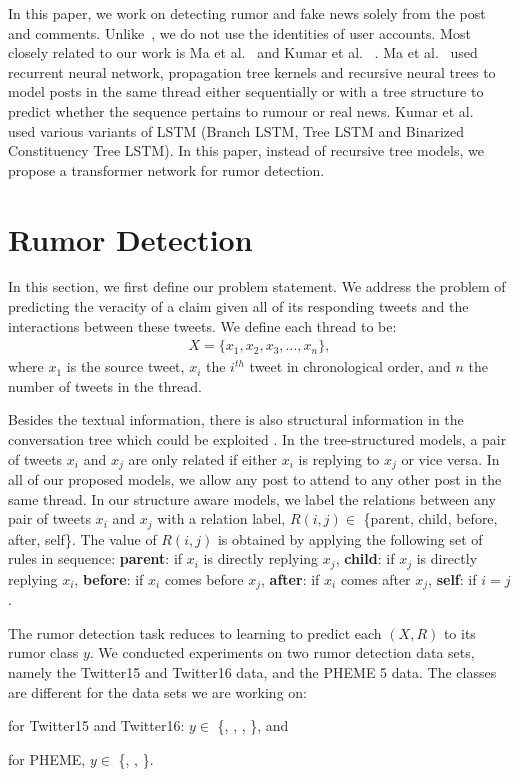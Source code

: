 \documentclass[letterpaper]{article} %
\begin{document}
In this paper, we work on detecting rumor and fake news solely from the post and comments. Unlike~\citet{li-etal-2019-rumor,yang12}, we do not use the identities of user accounts. Most closely related to our work is Ma et al.~ and Kumar et al. ~. Ma et al.~ used recurrent neural network, propagation tree kernels and recursive neural trees to model posts in the same thread either sequentially or with a tree structure to predict whether the sequence pertains to rumour or real news. Kumar et al.~ used various variants of LSTM (Branch LSTM, Tree LSTM and Binarized
Constituency Tree LSTM). In this paper, instead of recursive tree models, we propose a transformer network for rumor detection.

\section{Rumor Detection} \label{motivation_and_analysis}

In this section, we first define our problem statement. We address the problem of predicting the veracity of a claim given all of its responding tweets and the interactions between these tweets. We define each thread to be:
\begin{eqnarray*}
X = \{x_1, x_{2}, x_{3}, ... , x_{n}\},
\end{eqnarray*}
where $x_1$ is the source tweet, $x_{i}$ the $i^{th}$ tweet in chronological order, and $n$ the number of tweets in the thread.

Besides the textual information, there is also structural information in the conversation tree which could be exploited \cite{ma18,wu15a}. In the tree-structured models, a pair of tweets $x_{i}$ and $x_{j}$ are only related if either $x_{i}$ is replying to $x_{j}$ or vice versa. In all of our proposed models, we allow any post to attend to any other post in the same thread. In our structure aware models, we label the relations between any pair of tweets $x_{i}$ and $x_{j}$ with a relation label, $R(i,j) \in$ \{parent, child, before, after, self\}. The value of $R(i,j)$ is obtained by applying the following set of rules in sequence:
\textbf{parent}: if $x_{i}$ is directly replying $x_{j}$, \textbf{child}: if $x_{j}$ is directly replying $x_{i}$, \textbf{before}: if $x_{i}$ comes before $x_{j}$, \textbf{after}: if $x_{i}$ comes after $x_{j}$, \textbf{self}: if $i=j$.

The rumor detection task reduces to learning to predict each $(X,R)$ to its rumor class $y$. We conducted experiments on two rumor detection data sets, namely the Twitter15 and Twitter16 data, and the PHEME 5 data. The classes are different for the data sets we are working on:
\begin{itemize*}
\item for Twitter15 and Twitter16: $y\in$ \{\nonrumor{}, \falserumor{}, \truerumor{},  \unverified{}\}, and
\item for PHEME, $y \in $ \{\falserumor{}, \truerumor{},  \unverified{}\}.
\end{itemize*}
\end{document}
